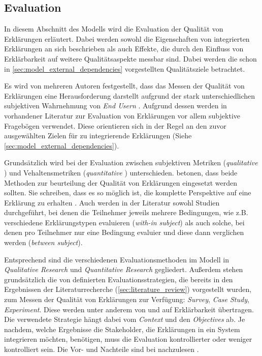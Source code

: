 \subsection{Evaluation}
\label{sec:model_evaluation_description}

In diesem Abschnitt des Modells wird die Evaluation der Qualität von Erklärungen erläutert. Dabei werden sowohl die Eigenschaften von integrierten Erklärungen an sich beschrieben als auch Effekte, die durch den Einfluss von Erklärbarkeit auf weitere Qualitätsaspekte messbar sind. Dabei werden die schon in \autoref{sec:model_external_dependencies} vorgestellten Qualitätsziele betrachtet.

Es wird von mehreren Autoren festgestellt, dass das Messen der Qualität von Erklärungen eine Herausforderung darstellt aufgrund der stark unterschiedlichen subjektiven Wahrnehmung von \textit{End Usern} \cite{nunes_systematic_2017, eiband_impact_2019, kouki_user_2017}. Aufgrund dessen werden in vorhandener Literatur zur Evaluation von Erklärungen vor allem subjektive Fragebögen verwendet. Diese orientieren sich in der Regel an den zuvor ausgewählten Zielen für zu integrierende Erklärungen (Siehe \autoref{sec:model_external_dependencies}).

Grundsätzlich wird bei der Evaluation zwischen subjektiven Metriken (\textit{qualitative} \citeauthor{wohlin2012experimentation}) und Vehaltensmetriken (\textit{quantitative} \citeauthor{wohlin2012experimentation}) unterschieden. \citeauthor{waa_evaluating_2021} betonen, dass beide Methoden zur beurteilung der Qualität von Erklärungen eingesetzt werden sollten. Sie schreiben, dass es so möglich ist, die \glqq komplette Perspektive\grqq{} auf eine Erklärung zu erhalten \cite[übersetzt vgl.][]{waa_evaluating_2021}. Auch werden in der Literatur sowohl Studien durchgeführt, bei denen die Teilnehmer jeweils mehrere Bedingungen, wie z.B. verschiedene Erklärungstypen evaluieren (\textit{with-in subject}) als auch solche, bei denen pro Teilnehmer nur eine Bedingung evaluier und diese dann verglichen werden (\textit{between subject}).

Entsprechend sind die verschiedenen Evaluationsmethoden im Modell in \textit{Qualitative Research} und \textit{Quantitative Research} gegliedert. Außerdem stehen grundsätzlich die von \citeauthor{wohlin2012experimentation} definierten Evaluationsstrategien, die bereits in den Ergebnissen der Literaturrecherche (\autoref{sec:literature_review}) vorgestellt wurden, zum Messen der Qualität von Erklärungen zur Verfügung: \textit{Survey}, \textit{Case Study}, \textit{Experiment}. Diese werden unter anderem von \citeauthor{ribera2019can} und \citeauthor{doshi2017towards} auf Erklärbarkeit übertragen. Die verwendete Strategie hängt dabei vom \textit{Context} und den \textit{Objectives} ab. Je nachdem, welche Ergebnisse die Stakeholder, die Erklärungen in ein System integrieren möchten, benötigen, muss die Evaluation kontrollierter oder weniger kontrolliert sein. Die Vor- und Nachteile sind bei \citeauthor{wohlin2012experimentation} nachzulesen \cite{wohlin2012experimentation}.

